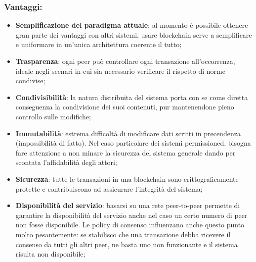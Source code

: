 		\subsubsection{Vantaggi:}
			\begin{itemize}
				\item \textbf{Semplificazione del paradigma attuale}: al momento è possibile ottenere gran parte dei vantaggi con altri sistemi, usare blockchain serve a semplificare e uniformare in un'unica architettura coerente il tutto;
				\item \textbf{Trasparenza}: ogni peer può controllare ogni transazione all'occorrenza, ideale negli scenari in cui sia necessario verificare il rispetto di norme condivise;
				\item \textbf{Condivisibilità}: la natura distribuita del sistema porta con se come diretta conseguenza la condivisione dei suoi contenuti, pur mantenendone pieno controllo sulle modifiche;
				\item \textbf{Immutabilità}: estrema difficoltà di modificare dati scritti in precendenza (impossibilità di fatto). Nel caso particolare dei sistemi permissioned, bisogna fare attenzione a non minare la sicurezza del sistema generale dando per scontata l'affidabilità degli attori;
				\item \textbf{Sicurezza}: tutte le transazioni in una blockchain sono crittograficamente protette e contribuiscono ad assicurare l'integrità del sistema;
				\item \textbf{Disponibilità del servizio}: basarsi su una rete peer-to-peer permette di garantire la disponibilità del servizio anche nel caso un certo numero di peer non fosse disponibile. Le policy di consenso influenzano anche questo punto molto pesantemente: se stabilisco che una transazione debba ricevere il consenso da tutti gli altri peer, ne basta uno non funzionante e il sistema risulta non disponibile;
			\end{itemize}
